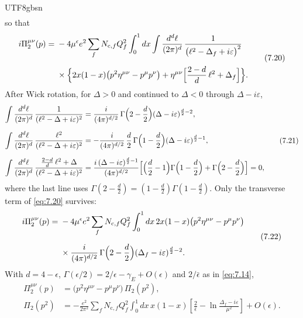 \documentclass[11pt,a4paper,oneside]{report}
\begin{document}
\begin{CJK*}{UTF8}{gbsn}
\begin{equation*}
\begin{aligned}
\end{aligned}
\tag{7.19}\label{eq:7.19}
\end{equation*}
so that
\begin{equation*}
\begin{aligned}
i\Pi_2^{\mu\nu}(p)
={}&-4\mu^{\epsilon}e^2\sum_fN_{\mathrm c,f}Q_f^2\int_0^1dx\int\frac{d^d\ell}{(2\pi)^d}\,
\frac{1}{\bigl(\ell^2-\Delta_f+i\varepsilon\bigr)^2}\\[6pt]
&\times\Bigl\{2x(1-x)\bigl(p^2\eta^{\mu\nu}-p^\mu p^\nu\bigr)+\eta^{\mu\nu}\Bigl[\frac{2-d}{d}\,\ell^2+\Delta_f\Bigr]\Bigr\}.
\end{aligned}
\tag{7.20}\label{eq:7.20}
\end{equation*}
After Wick rotation, for $\Delta>0$ and continued to $\Delta<0$ through $\Delta-i\varepsilon$,
\begin{equation*}
\begin{aligned}
\int\frac{d^d\ell}{(2\pi)^d}\,\frac{1}{(\ell^2-\Delta+i\varepsilon)^2}
&=\frac{i}{(4\pi)^{d/2}}\,\Gamma\Bigl(2-\frac d2\Bigr)(\Delta-i\varepsilon)^{\frac d2-2},\\[6pt]
\int\frac{d^d\ell}{(2\pi)^d}\,\frac{\ell^2}{(\ell^2-\Delta+i\varepsilon)^2}
&=-\frac{i}{(4\pi)^{d/2}}\,\frac d2\,\Gamma\Bigl(1-\frac d2\Bigr)(\Delta-i\varepsilon)^{\frac d2-1},\\[6pt]
\int\frac{d^d\ell}{(2\pi)^d}\,\frac{\frac{2-d}{d}\,\ell^2+\Delta}{(\ell^2-\Delta+i\varepsilon)^2}
&=\frac{i\,(\Delta-i\varepsilon)^{\frac d2-1}}{(4\pi)^{d/2}}\Bigl[\Bigl(\frac d2-1\Bigr)\Gamma\Bigl(1-\frac d2\Bigr)+\Gamma\Bigl(2-\frac d2\Bigr)\Bigr]=0,
\end{aligned}
\tag{7.21}\label{eq:7.21}
\end{equation*}
where the last line uses $\Gamma(2-\tfrac d2)=(1-\tfrac d2)\Gamma(1-\tfrac d2)$. Only the transverse term of \eqref{eq:7.20} survives:
\begin{equation*}
\begin{aligned}
i\Pi_2^{\mu\nu}(p)
={}&-4\mu^{\epsilon}e^2\sum_fN_{\mathrm c,f}Q_f^2\int_0^1dx\,2x(1-x)\bigl(p^2\eta^{\mu\nu}-p^\mu p^\nu\bigr)\\[6pt]
&\times\frac{i}{(4\pi)^{d/2}}\,\Gamma\Bigl(2-\frac d2\Bigr)(\Delta_f-i\varepsilon)^{\frac d2-2} .
\end{aligned}
\tag{7.22}\label{eq:7.22}
\end{equation*}
With $d=4-\epsilon$, $\Gamma(\epsilon/2)=2/\epsilon-\gamma_E+O(\epsilon)$ and $2/\bar\epsilon$ as in \eqref{eq:7.14},
\begin{equation*}
{\displaystyle 
\begin{aligned}
\Pi_2^{\mu\nu}(p)&=\bigl(p^2\eta^{\mu\nu}-p^\mu p^\nu\bigr)\,\Pi_2(p^2),\\[6pt]
\Pi_2(p^2)&=-\frac{e^2}{2\pi^2}\sum_fN_{\mathrm c,f}Q_f^2\int_0^1dx\,x(1-x)\left[\frac2{\bar\epsilon}-\ln\frac{\Delta_f-i\varepsilon}{\mu^2}\right]+O(\epsilon).
\end{aligned}
}
\tag{7.23}\label{eq:7.23}
\end{equation*}


\end{CJK*}
\end{document}
